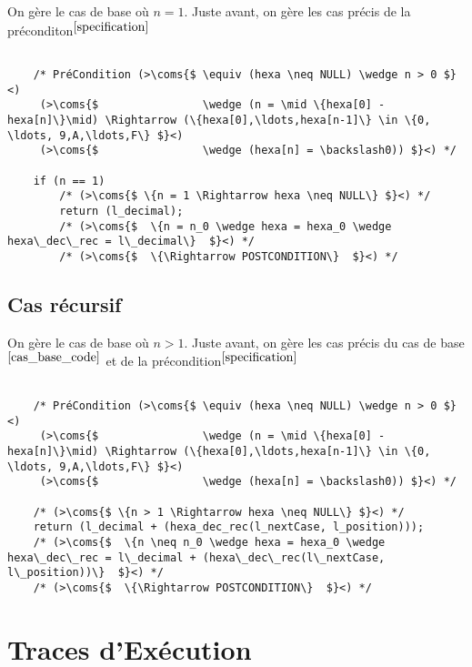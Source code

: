 \documentclass[a4paper, 11pt, oneside]{article}
\newcommand{\coms}[1]{\textcolor{MidnightBlue}{#1}}
\begin{document}
	
	On gère le cas de base où $n = 1$. Juste avant, on gère les cas précis de la préconditon$^{\ref{specification}}$
	
		\begin{lstlisting}[caption={Cas de base}]
	
	/* PréCondition (>\coms{$ \equiv (hexa \neq NULL) \wedge n > 0 $}<) 
	 (>\coms{$                \wedge (n = \mid \{hexa[0] - hexa[n]\}\mid) \Rightarrow (\{hexa[0],\ldots,hexa[n-1]\} \in \{0, \ldots, 9,A,\ldots,F\} $}<)  
     (>\coms{$      	      \wedge (hexa[n] = \backslash0)) $}<) */

	if (n == 1)
		/* (>\coms{$ \{n = 1 \Rightarrow hexa \neq NULL\} $}<) */
		return (l_decimal);
		/* (>\coms{$  \{n = n_0 \wedge hexa = hexa_0 \wedge hexa\_dec\_rec = l\_decimal\}  $}<) */
		/* (>\coms{$  \{\Rightarrow POSTCONDITION\}  $}<) */

		\end{lstlisting}
				
	\subsection{Cas récursif}
	
		On gère le cas de base où $n > 1$. Juste avant, on gère les cas précis du cas de base $^{\ref{cas_base_code}}$ et de la précondition$^{\ref{specification}}$
	
		\begin{lstlisting}[caption={Cas récursif}]
	
	/* PréCondition (>\coms{$ \equiv (hexa \neq NULL) \wedge n > 0 $}<) 
	 (>\coms{$                \wedge (n = \mid \{hexa[0] - hexa[n]\}\mid) \Rightarrow (\{hexa[0],\ldots,hexa[n-1]\} \in \{0, \ldots, 9,A,\ldots,F\} $}<)  
     (>\coms{$      	      \wedge (hexa[n] = \backslash0)) $}<) */

	/* (>\coms{$ \{n > 1 \Rightarrow hexa \neq NULL\} $}<) */
	return (l_decimal + (hexa_dec_rec(l_nextCase, l_position)));
	/* (>\coms{$  \{n \neq n_0 \wedge hexa = hexa_0 \wedge hexa\_dec\_rec = l\_decimal + (hexa\_dec\_rec(l\_nextCase, l\_position))\}  $}<) */
	/* (>\coms{$  \{\Rightarrow POSTCONDITION\}  $}<) */

		\end{lstlisting}

\section{Traces d'Exécution}\label{traces}
\end{document}
